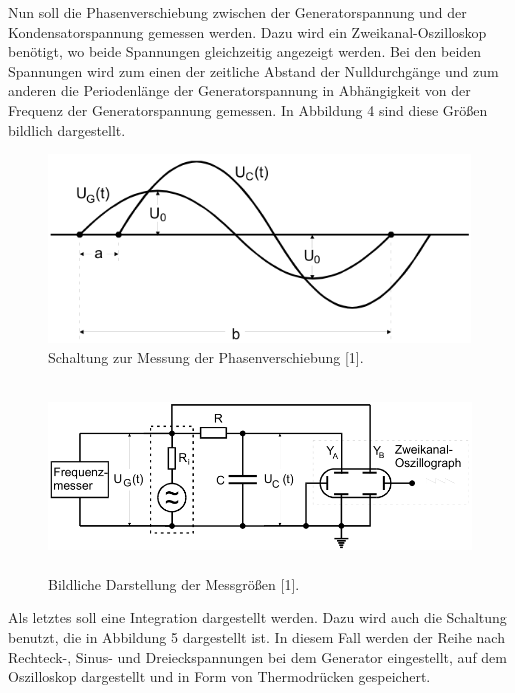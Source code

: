 Nun soll die Phasenverschiebung zwischen der Generatorspannung und der Kondensatorspannung
gemessen werden. Dazu wird ein Zweikanal-Oszilloskop benötigt, wo beide Spannungen
gleichzeitig angezeigt werden. Bei den beiden Spannungen wird zum einen der
zeitliche Abstand der Nulldurchgänge und zum anderen die Periodenlänge der Generatorspannung
in Abhängigkeit von der Frequenz der Generatorspannung gemessen.
In Abbildung 4 sind diese Größen bildlich dargestellt.

\begin{figure}[H]
  \centering
  \includegraphics[height=5cm, width=\textwidth]{D4.png}
  \caption{Schaltung zur Messung der Phasenverschiebung [1].}
\end{figure}

\begin{figure}[H]
  \centering
  \includegraphics[height=5cm, width=\textwidth]{D3.png}
  \caption{Bildliche Darstellung der Messgrößen [1].}
\end{figure}

Als letztes soll eine Integration dargestellt werden. Dazu wird auch die Schaltung
benutzt, die in Abbildung 5 dargestellt ist. In diesem Fall werden der Reihe nach
Rechteck-, Sinus- und Dreieckspannungen bei dem Generator eingestellt, auf
dem Oszilloskop dargestellt und in Form von Thermodrücken gespeichert.
